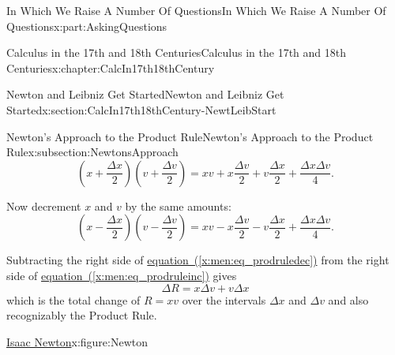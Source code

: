 \documentclass[oneside,10pt,]{book}
\newcommand{\xreffont}{\relax}
\numberwithin{equation}{section}
\begin{document}
\begin{partptx}{In Which We Raise A Number Of Questions}{}{In Which We Raise A Number Of Questions}{}{}{x:part:AskingQuestions}
\begin{chapterptx}{Calculus in the 17th and 18th Centuries}{}{Calculus in the 17th and 18th Centuries}{}{}{x:chapter:CalcIn17th18thCentury}
\begin{sectionptx}{Newton and Leibniz Get Started}{}{Newton and Leibniz Get Started}{}{}{x:section:CalcIn17th18thCentury-NewtLeibStart}
\begin{subsectionptx}{Newton's Approach to the Product Rule}{}{Newton's Approach to the Product Rule}{}{}{x:subsection:NewtonsApproach}
\begin{equation}
\left(x+\frac{\Delta x}{2}\right)\left(v+\frac{\Delta v}{2}\right) = xv + x\frac{\Delta v}{2} + v\frac{\Delta x}{2} +\frac{\Delta x\Delta v}{4}\text{.}\label{x:men:eq_prodruleinc}
\end{equation}
%
\par
Now decrement \(x\) and \(v\) by the same amounts:%
\begin{equation}
\left(x-\frac{\Delta x}{2}\right)\left(v-\frac{\Delta v}{2}\right) = xv - x\frac{\Delta v}{2} - v\frac{\Delta x}{2} + \frac{\Delta x\Delta v}{4}\text{.}\label{x:men:eq_prodruledec}
\end{equation}
%
\par
Subtracting the right side of \hyperref[x:men:eq_prodruledec]{equation~({\xreffont\ref{x:men:eq_prodruledec}})} from the right side of \hyperref[x:men:eq_prodruleinc]{equation~({\xreffont\ref{x:men:eq_prodruleinc}})} gives%
\begin{equation*}
\Delta R = x\Delta v + v\Delta x
\end{equation*}
which is the total change of \(R = xv\) over the intervals \(\Delta x\) and \(\Delta v\) and also recognizably the Product Rule.%
\begin{figureptx}{\href{https://mathshistory.st-andrews.ac.uk/Biographies/Newton/}{Isaac Newton}\protect\footnotemark{}}{x:figure:Newton}{}%
%
\begin{image}{0.325}{0.35}{0.325}%

\end{image}
\end{figureptx}
\end{subsectionptx}
\end{sectionptx}
\end{chapterptx}
\end{partptx}
\end{document}
